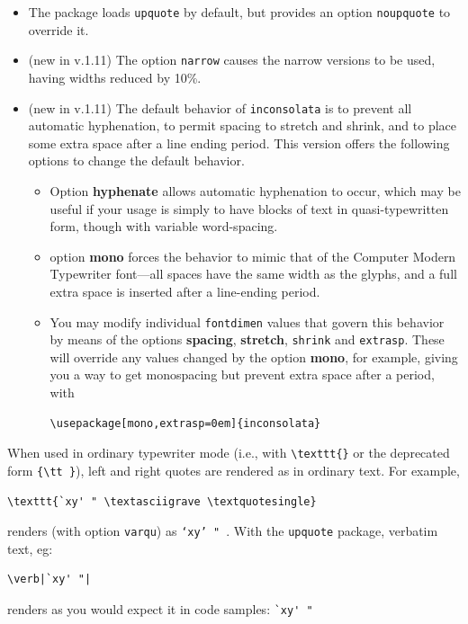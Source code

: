 \documentclass[11pt]{article}
\begin{document}
{\begin{itemize}
\item The package loads \texttt{upquote} by default, but provides an option \texttt{noupquote} to override it.
\item (new in v.1.11) The option \texttt{narrow} causes the narrow versions to be used, having widths reduced by 10\%.
\item (new in v.1.11) The default behavior of {\tt inconsolata} is to prevent all automatic hyphenation, to permit spacing to stretch and shrink, and to place some extra space after a line ending period. This version offers the following options to change the default behavior.  
\begin{itemize}
\item
Option \textbf{hyphenate} allows automatic hyphenation to occur, which may be useful if your usage is simply to have blocks of text in quasi-typewritten form, though with variable word-spacing.
\item option \textbf{mono} forces the behavior to mimic that of the Computer Modern Typewriter font---all spaces have the same width as the glyphs, and a full extra space is inserted after a line-ending period.
\item You may modify individual {\tt fontdimen} values that govern this behavior by means of the options \textbf{spacing}, \textbf{stretch}, {\tt shrink} and {\tt extrasp}. These will override any values changed by the option \textbf{mono}, for example, giving you a way to get monospacing but prevent extra space after a period, with
\begin{verbatim}
\usepackage[mono,extrasp=0em]{inconsolata}
\end{verbatim}
\end{itemize}
\end{itemize}
When used in ordinary typewriter mode (i.e., with \verb|\texttt{}| or the deprecated form \verb|{\tt }|), left and right quotes are rendered as in ordinary text. For example, 
\begin{verbatim}
\texttt{`xy' " \textasciigrave \textquotesingle}
\end{verbatim}
renders (with option \texttt{varqu}) as \texttt{`xy' " \textasciigrave \textquotesingle}. With the \texttt{upquote} package, verbatim text, eg:
\begin{verbatim}
\verb|`xy' "|
\end{verbatim}
 renders as you would expect it in code samples:
\verb|`xy' "|

}
\end{document}
